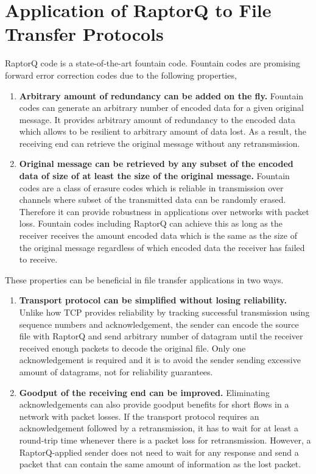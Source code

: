 \documentclass{sig-alternate-10pt}
\begin{document}
\section{Application of RaptorQ to File Transfer Protocols}
RaptorQ code is a state-of-the-art fountain code. Fountain codes are promising
forward error correction codes due to the following properties,
\begin{enumerate}[label=(\alph*)]
  \item \textbf{Arbitrary amount of redundancy can be added on the fly.}
  Fountain codes can generate an arbitrary number of encoded data for a given
  original message. It provides arbitrary amount of redundancy to the encoded
  data which allows to be resilient to arbitrary amount of data lost. As a
  result, the receiving end can retrieve the original message without any
  retransmission.

  \item \textbf{Original message can be retrieved by any subset of the encoded
  data of size of at least the size of the original message.} 
  Fountain codes are a class of erasure codes which is reliable in transmission
  over channels where subset of the transmitted data can be randomly erased.
  Therefore it can provide robustness in applications over networks with packet
  loss. Fountain codes including RaptorQ can achieve this as long as the
  receiver receives the amount encoded data which is the same as the size of the
  original message regardless of which encoded data the receiver has failed to
  receive.   
\end{enumerate}

These properties can be beneficial in file transfer applications in two ways.
\begin{enumerate}[label=(\alph*)]
  \item \textbf{Transport protocol can be simplified without losing
  reliability.}
  Unlike how TCP provides reliability by tracking successful transmission using
  sequence numbers and acknowledgement, the sender can encode the source file
  with RaptorQ and send arbitrary number of datagram until the receiver received
  enough packets to decode the original file. Only one acknowledgement is
  required and it is to avoid the sender sending excessive amount of datagrams,
  not for reliability guarantees.
  \item \textbf{Goodput of the receiving end can be improved.}
  Eliminating acknowledgements can also provide goodput benefits for short flows
  in a network with packet losses. If the transport protocol requires an
  acknowledgement followed by a retransmission, it has to wait for at least a
  round-trip time whenever there is a packet loss for retransmission. However,
  a RaptorQ-applied sender does not need to wait for any response and send a
  packet that can contain the same amount of information as the lost packet.
\end{enumerate}
\end{document}

